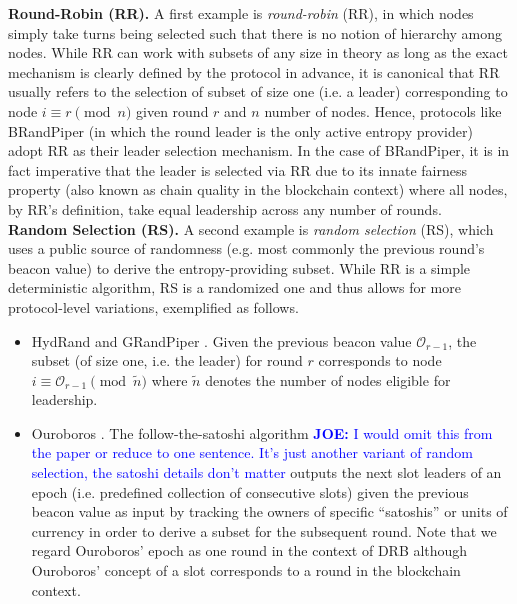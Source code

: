 \documentclass[letterpaper,twocolumn,10pt]{article}
\theoremstyle{definition}
\theoremstyle{remark}
\newcommand{\joenote}[1]{\textcolor{blue}{\textbf{JOE:} #1}}
\begin{document}
\noindent\textbf{Round-Robin (RR).} A first example is \textit{round-robin} (RR), in which nodes simply take turns being selected such that there is no notion of hierarchy among nodes. While RR can work with subsets of any size in theory as long as the exact mechanism is clearly defined by the protocol in advance, it is canonical that RR usually refers to the selection of subset of size one (i.e. a leader) corresponding to node $i \equiv r \pmod n$ given round $r$ and $n$ number of nodes. Hence, protocols like BRandPiper \cite{bhat2020randpiper} (in which the round leader is the only active entropy provider) adopt RR as their leader selection mechanism. In the case of BRandPiper, it is in fact imperative that the leader is selected via RR due to its innate fairness property \cite{azouvi2018winning} (also known as chain quality \cite{garay2015bitcoin} in the blockchain context) where all nodes, by RR's definition, take equal leadership across any number of rounds.\\

\noindent\textbf{Random Selection (RS).} A second example is \textit{random selection} (RS), which uses a public source of randomness (e.g. most commonly the previous round's beacon value) to derive the entropy-providing subset. While RR is a simple deterministic algorithm, RS is a randomized one and thus allows for more protocol-level variations, exemplified as follows.
\begin{itemize}
\item HydRand \cite{schindler2020hydrand} and GRandPiper \cite{bhat2020randpiper}. Given the previous beacon value $\mathcal{O}_{r - 1}$, the subset (of size one, i.e. the leader) for round $r$ corresponds to node $i \equiv \mathcal{O}_{r - 1} \pmod{\tilde{n}}$ where $\tilde{n}$ denotes the number of nodes eligible for leadership.
\item Ouroboros \cite{kiayias2017ouroboros}. The follow-the-satoshi algorithm \cite{bentov2014proof,kiayias2017ouroboros}\joenote{I would omit this from the paper or reduce to one sentence. It's just another variant of random selection, the satoshi details don't matter} outputs the next slot leaders of an epoch (i.e. predefined collection of consecutive slots) given the previous beacon value as input by tracking the owners of specific ``satoshis'' or units of currency in order to derive a subset for the subsequent round. Note that we regard Ouroboros' epoch as one round in the context of DRB although Ouroboros' concept of a slot corresponds to a round in the blockchain context.
\end{itemize}
\end{document}
